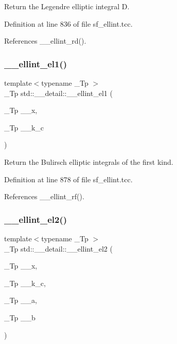 Return the Legendre elliptic integral D. 

Definition at line 836 of file sf\+\_\+ellint.\+tcc.



References \+\_\+\+\_\+ellint\+\_\+rd().

\mbox{\label{namespacestd_1_1____detail_aa17b1b382a89552f49fbb8c5eda1d50f}} 
\subsubsection{\texorpdfstring{\+\_\+\+\_\+ellint\+\_\+el1()}{\_\_ellint\_el1()}}
{\footnotesize\ttfamily template$<$typename \+\_\+\+Tp $>$ \\
\+\_\+\+Tp std\+::\+\_\+\+\_\+detail\+::\+\_\+\+\_\+ellint\+\_\+el1 (\begin{DoxyParamCaption}\item[{\+\_\+\+Tp}]{\+\_\+\+\_\+x,  }\item[{\+\_\+\+Tp}]{\+\_\+\+\_\+k\+\_\+c }\end{DoxyParamCaption})}

Return the Bulirsch elliptic integrals of the first kind. 

Definition at line 878 of file sf\+\_\+ellint.\+tcc.



References \+\_\+\+\_\+ellint\+\_\+rf().

\mbox{\label{namespacestd_1_1____detail_a82449d0f05d40ba2cef6b8fc57dd5bae}} 
\subsubsection{\texorpdfstring{\+\_\+\+\_\+ellint\+\_\+el2()}{\_\_ellint\_el2()}}
{\footnotesize\ttfamily template$<$typename \+\_\+\+Tp $>$ \\
\+\_\+\+Tp std\+::\+\_\+\+\_\+detail\+::\+\_\+\+\_\+ellint\+\_\+el2 (\begin{DoxyParamCaption}\item[{\+\_\+\+Tp}]{\+\_\+\+\_\+x,  }\item[{\+\_\+\+Tp}]{\+\_\+\+\_\+k\+\_\+c,  }\item[{\+\_\+\+Tp}]{\+\_\+\+\_\+a,  }\item[{\+\_\+\+Tp}]{\+\_\+\+\_\+b }\end{DoxyParamCaption})}

